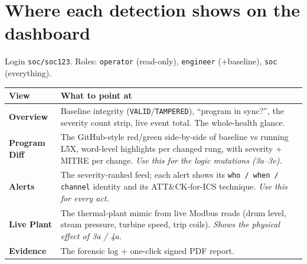 \documentclass[11pt,a4paper]{article}
\newcommand{\code}[1]{\texttt{\small #1}}
\begin{document}
\section{Where each detection shows on the dashboard}
Login \code{soc/soc123}. Roles: \code{operator} (read-only), \code{engineer}
(+baseline), \code{soc} (everything).
\begin{tabularx}{\textwidth}{@{}p{3.2cm} L@{}}
\toprule
\textbf{View} & \textbf{What to point at} \\
\midrule
\textbf{Overview} & Baseline integrity (\code{VALID}/\code{TAMPERED}), ``program in sync?'',
  the severity count strip, live event total. The whole-health glance. \\
\textbf{Program Diff} & The GitHub-style red/green side-by-side of baseline vs running L5X,
  word-level highlights per changed rung, with severity + MITRE per change. \emph{Use this
  for the logic mutations (3a--3e).} \\
\textbf{Alerts} & The severity-ranked feed; each alert shows its \code{who / when / channel}
  identity and its ATT\&CK-for-ICS technique. \emph{Use this for every act.} \\
\textbf{Live Plant} & The thermal-plant mimic from live Modbus reads (drum level, steam
  pressure, turbine speed, trip coils). \emph{Shows the physical effect of 3a / 4a.} \\
\textbf{Evidence} & The forensic log + one-click signed PDF report. \\
\bottomrule
\end{tabularx}

\end{document}
